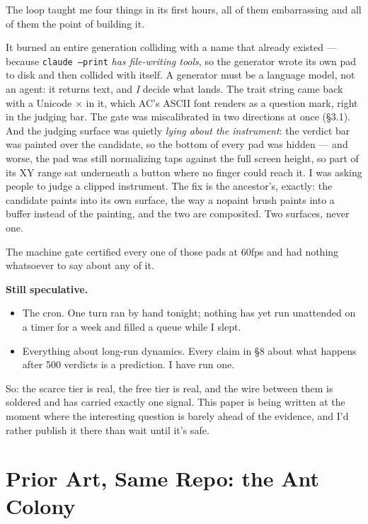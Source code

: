 \documentclass[10pt,letterpaper,twocolumn]{article}
\begin{document}
The loop taught me four things in its first hours, all of them embarrassing and all of them the point of building it.

It burned an entire generation colliding with a name that already existed --- because \texttt{claude --print} \emph{has file-writing tools}, so the generator wrote its own pad to disk and then collided with itself. A generator must be a language model, not an agent: it returns text, and \emph{I} decide what lands. The trait string came back with a Unicode $\times$ in it, which AC's ASCII font renders as a question mark, right in the judging bar. The gate was miscalibrated in two directions at once (\S3.1). And the judging surface was quietly \emph{lying about the instrument}: the verdict bar was painted over the candidate, so the bottom of every pad was hidden --- and worse, the pad was still normalizing taps against the full screen height, so part of its XY range sat underneath a button where no finger could reach it. I was asking people to judge a clipped instrument. The fix is the ancestor's, exactly: the candidate paints into its own surface, the way a nopaint brush paints into a buffer instead of the painting, and the two are composited. Two surfaces, never one.

The machine gate certified every one of those pads at 60fps and had nothing whatsoever to say about any of it.

\textbf{Still speculative.}
\begin{itemize}
  \item The cron. One turn ran by hand tonight; nothing has yet run unattended on a timer for a week and filled a queue while I slept.
  \item Everything about long-run dynamics. Every claim in \S8 about what happens after 500 verdicts is a prediction. I have run one.
\end{itemize}

So: the scarce tier is real, the free tier is real, and the wire between them is soldered and has carried exactly one signal. This paper is being written at the moment where the interesting question is barely ahead of the evidence, and I'd rather publish it there than wait until it's safe.


\section{Prior Art, Same Repo: the Ant Colony}
\end{document}

